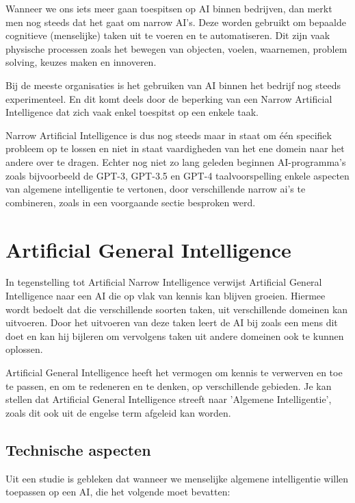 Wanneer we ons iets meer gaan toespitsen op AI binnen bedrijven, dan merkt men nog steeds dat het gaat om narrow AI’s. Deze worden gebruikt om bepaalde cognitieve (menselijke) taken uit te voeren en te automatiseren. Dit zijn vaak physische processen zoals het bewegen van objecten, voelen, waarnemen, problem solving, keuzes maken en innoveren. 

Bij de meeste organisaties is het gebruiken van AI binnen het bedrijf nog steeds experimenteel. En dit komt deels door de beperking van een Narrow Artificial Intelligence dat zich vaak enkel toespitst op een enkele taak.

Narrow Artificial Intelligence is dus nog steeds maar in staat om één specifiek probleem op te lossen en niet in staat vaardigheden van het ene domein naar het andere over te dragen. Echter nog niet zo lang geleden beginnen AI-programma’s zoals bijvoorbeeld de GPT-3, GPT-3.5 en GPT-4 taalvoorspelling enkele aspecten van algemene intelligentie te vertonen, door verschillende narrow ai's te combineren, zoals in een voorgaande sectie besproken werd.

\autocite{benbya2020artificial}

\section{Artificial General Intelligence}

In tegenstelling tot Artificial Narrow Intelligence verwijst Artificial General Intelligence naar een AI die op vlak van kennis kan blijven groeien. Hiermee wordt bedoelt dat die verschillende soorten taken, uit verschillende domeinen kan uitvoeren. Door het uitvoeren van deze taken leert de AI bij zoals een mens dit doet en kan hij bijleren om vervolgens taken uit andere domeinen ook te kunnen oplossen. 

Artificial General Intelligence heeft het vermogen om kennis te verwerven en toe te passen, en om te redeneren en te denken, op verschillende gebieden. Je kan stellen dat Artificial General Intelligence streeft naar 'Algemene Intelligentie', zoals dit ook uit de engelse term afgeleid kan worden. 

\subsection{Technische aspecten}

Uit een studie is gebleken dat wanneer we menselijke algemene intelligentie willen toepassen op een AI, die het volgende moet bevatten: \linebreak


